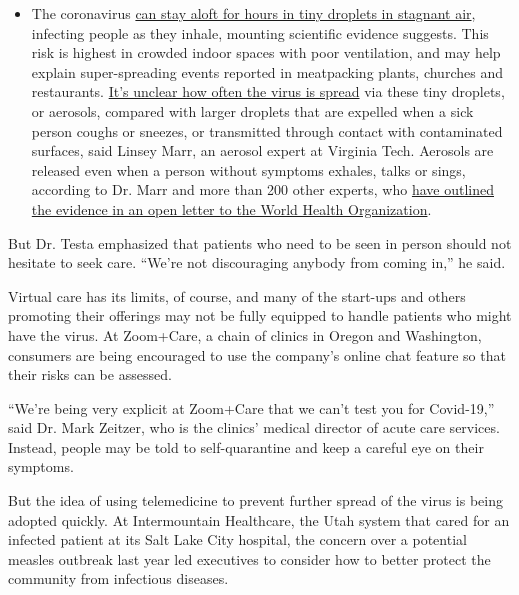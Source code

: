 \begin{itemize}
  \begin{itemize}
  \tightlist
  \item
    The coronavirus
    \href{https://www.nytimes3xbfgragh.onion/2020/07/04/health/239-experts-with-one-big-claim-the-coronavirus-is-airborne.html?action=click\&pgtype=Article\&state=default\&region=MAIN_CONTENT_3\&context=storylines_faq}{can
    stay aloft for hours in tiny droplets in stagnant air}, infecting
    people as they inhale, mounting scientific evidence suggests. This
    risk is highest in crowded indoor spaces with poor ventilation, and
    may help explain super-spreading events reported in meatpacking
    plants, churches and restaurants.
    \href{https://www.nytimes3xbfgragh.onion/2020/07/06/health/coronavirus-airborne-aerosols.html?action=click\&pgtype=Article\&state=default\&region=MAIN_CONTENT_3\&context=storylines_faq}{It's
    unclear how often the virus is spread} via these tiny droplets, or
    aerosols, compared with larger droplets that are expelled when a
    sick person coughs or sneezes, or transmitted through contact with
    contaminated surfaces, said Linsey Marr, an aerosol expert at
    Virginia Tech. Aerosols are released even when a person without
    symptoms exhales, talks or sings, according to Dr. Marr and more
    than 200 other experts, who
    \href{https://academic.oup.com/cid/article/doi/10.1093/cid/ciaa939/5867798}{have
    outlined the evidence in an open letter to the World Health
    Organization}.
  \end{itemize}
\end{itemize}

But Dr. Testa emphasized that patients who need to be seen in person
should not hesitate to seek care. ``We're not discouraging anybody from
coming in,'' he said.

Virtual care has its limits, of course, and many of the start-ups and
others promoting their offerings may not be fully equipped to handle
patients who might have the virus. At Zoom+Care, a chain of clinics in
Oregon and Washington, consumers are being encouraged to use the
company's online chat feature so that their risks can be assessed.

``We're being very explicit at Zoom+Care that we can't test you for
Covid-19,'' said Dr. Mark Zeitzer, who is the clinics' medical director
of acute care services. Instead, people may be told to self-quarantine
and keep a careful eye on their symptoms.

But the idea of using telemedicine to prevent further spread of the
virus is being adopted quickly. At Intermountain Healthcare, the Utah
system that cared for an infected patient at its Salt Lake City
hospital, the concern over a potential measles outbreak last year led
executives to consider how to better protect the community from
infectious diseases.

